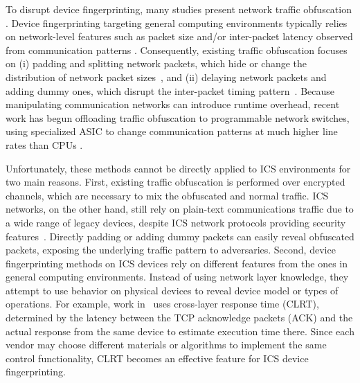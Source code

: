 
To disrupt device fingerprinting, many studies present network traffic obfuscation \cite{wright2009, dyer2012}. Device fingerprinting targeting general computing environments typically relies on network-level features such as packet size and/or inter-packet latency observed from communication patterns \cite{sirinam2018}. Consequently, existing traffic obfuscation focuses on (i) padding and splitting network packets, which hide or change the distribution of network packet sizes~\cite{wright2009}, and (ii) delaying network packets and adding dummy ones, which disrupt the inter-packet timing pattern~\cite{dyer2012, tamaraw2014}. Because manipulating communication networks can introduce runtime overhead, recent work has begun offloading traffic obfuscation to programmable network switches, using specialized ASIC to change communication patterns at much higher line rates than CPUs \cite{ditto2022, minos2025,securitas2026}. 

Unfortunately, these methods cannot be directly applied to ICS environments for two main reasons. 
First, existing traffic obfuscation is performed over encrypted channels, which are necessary to mix the obfuscated and normal traffic. ICS networks, on the other hand, still rely on plain-text communications traffic due to a wide range of legacy devices, despite ICS network protocols providing security features~\cite{dnp3std}. Directly padding or adding dummy packets can easily reveal obfuscated packets, exposing the underlying traffic pattern to adversaries. 
Second, device fingerprinting methods on ICS devices rely on different features from the ones in general computing environments. Instead of using network layer knowledge, they attempt to use behavior on physical devices to reveal device model or types of operations. For example, work in~\cite{formby2016} uses cross-layer response time (CLRT), determined by the latency between the TCP acknowledge packets (ACK) and the actual response from the same device to estimate execution time there. Since each vendor may choose different materials or algorithms to implement the same control functionality, CLRT becomes an effective feature for ICS device fingerprinting. 

